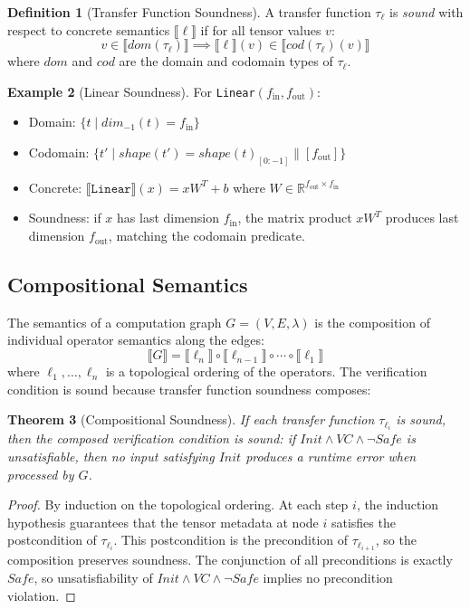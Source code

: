 \documentclass[10pt]{article}
\newcommand{\sem}[1]{\llbracket #1 \rrbracket}
\theoremstyle{plain}
\newtheorem{theorem}{Theorem}[section]
\theoremstyle{definition}
\newtheorem{definition}[theorem]{Definition}
\newtheorem{example}[theorem]{Example}
\theoremstyle{remark}
\begin{document}
\begin{definition}[Transfer Function Soundness]
A transfer function $\tau_\ell$ is \emph{sound} with respect to
concrete semantics $\sem{\ell}$ if for all tensor values $v$:
\[
  v \in \sem{\mathit{dom}(\tau_\ell)} \implies
  \sem{\ell}(v) \in \sem{\mathit{cod}(\tau_\ell)(v)}
\]
where $\mathit{dom}$ and $\mathit{cod}$ are the domain and codomain
types of $\tau_\ell$.
\end{definition}

\begin{example}[Linear Soundness]
For \texttt{Linear}$(f_\text{in}, f_\text{out})$:
\begin{itemize}[nosep]
  \item Domain: $\{t \mid \mathit{dim}_{-1}(t) = f_\text{in}\}$
  \item Codomain: $\{t' \mid \mathit{shape}(t') = \mathit{shape}(t)_{[0:-1]} \| [f_\text{out}]\}$
  \item Concrete: $\sem{\texttt{Linear}}(x) = xW^T + b$ where
    $W \in \mathbb{R}^{f_\text{out} \times f_\text{in}}$
  \item Soundness: if $x$ has last dimension $f_\text{in}$, the
    matrix product $xW^T$ produces last dimension $f_\text{out}$,
    matching the codomain predicate.
\end{itemize}
\end{example}

\subsection{Compositional Semantics}

The semantics of a computation graph $G = (V, E, \lambda)$ is
the composition of individual operator semantics along the edges:
\[
  \sem{G} = \sem{\ell_n} \circ \sem{\ell_{n-1}} \circ \cdots \circ
    \sem{\ell_1}
\]
where $\ell_1, \ldots, \ell_n$ is a topological ordering of the
operators.  The verification condition is sound because transfer
function soundness composes:

\begin{theorem}[Compositional Soundness]
If each transfer function $\tau_{\ell_i}$ is sound, then the
composed verification condition is sound: if
$\mathit{Init} \land \mathit{VC} \land \neg\mathit{Safe}$ is
unsatisfiable, then no input satisfying $\mathit{Init}$ produces a
runtime error when processed by $G$.
\end{theorem}

\begin{proof}
By induction on the topological ordering.  At each step $i$, the
induction hypothesis guarantees that the tensor metadata at node $i$
satisfies the postcondition of $\tau_{\ell_i}$.  This postcondition
is the precondition of $\tau_{\ell_{i+1}}$, so the composition
preserves soundness.  The conjunction of all preconditions is
exactly $\mathit{Safe}$, so unsatisfiability of
$\mathit{Init} \land \mathit{VC} \land \neg\mathit{Safe}$ implies
no precondition violation.
\end{proof}
\end{document}
